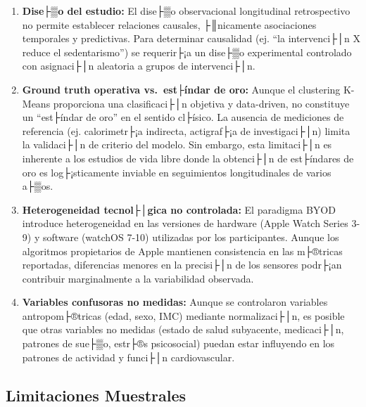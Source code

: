 \begin{enumerate}
    \item \textbf{Dise├▒o del estudio:} El dise├▒o observacional longitudinal retrospectivo no permite establecer relaciones causales, ├║nicamente asociaciones temporales y predictivas. Para determinar causalidad (ej. ``la intervenci├│n X reduce el sedentarismo'') se requerir├¡a un dise├▒o experimental controlado con asignaci├│n aleatoria a grupos de intervenci├│n.
    
    \item \textbf{Ground truth operativa vs.\ est├índar de oro:} Aunque el clustering K-Means proporciona una clasificaci├│n objetiva y data-driven, no constituye un ``est├índar de oro'' en el sentido cl├ísico. La ausencia de mediciones de referencia (ej. calorimetr├¡a indirecta, actigraf├¡a de investigaci├│n) limita la validaci├│n de criterio del modelo. Sin embargo, esta limitaci├│n es inherente a los estudios de vida libre donde la obtenci├│n de est├índares de oro es log├¡sticamente inviable en seguimientos longitudinales de varios a├▒os.
    
    \item \textbf{Heterogeneidad tecnol├│gica no controlada:} El paradigma BYOD introduce heterogeneidad en las versiones de hardware (Apple Watch Series 3-9) y software (watchOS 7-10) utilizadas por los participantes. Aunque los algoritmos propietarios de Apple mantienen consistencia en las m├®tricas reportadas, diferencias menores en la precisi├│n de los sensores podr├¡an contribuir marginalmente a la variabilidad observada.
    
    \item \textbf{Variables confusoras no medidas:} Aunque se controlaron variables antropom├®tricas (edad, sexo, IMC) mediante normalizaci├│n, es posible que otras variables no medidas (estado de salud subyacente, medicaci├│n, patrones de sue├▒o, estr├®s psicosocial) puedan estar influyendo en los patrones de actividad y funci├│n cardiovascular.
\end{enumerate}

\subsection{Limitaciones Muestrales}
\label{subsec:limitaciones_muestrales}

